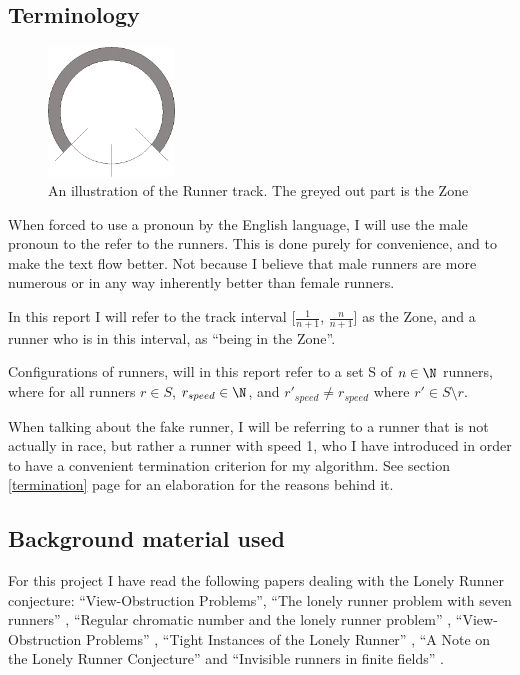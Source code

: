 \subsection{Terminology}
\label{Termonolgy}
\begin{figure}[H]
  \centering
  \includegraphics[width=0.3\textwidth]{./images/circleZonePng.png}
  \caption{\label{circleZoneImg}An illustration of the Runner track. The greyed out part is the Zone}
\end{figure}

When forced to use a pronoun by the English language, I will use the male pronoun to the refer to the runners. This is done purely for convenience, and to make the text flow better. Not because I believe that male runners are more numerous or in any way inherently better than female runners.

\begin{defi}
\label{def:theZone}
In this report I will refer to the track interval [$\frac{1}{n + 1}$, $\frac{n}{n+1}$] as the Zone, and a runner who is in this interval, as ``being in the Zone''.
\end{defi}

\begin{defi}
\label{def:config}
Configurations of runners, will in this report refer to a set S of $n \in \N$ runners, where for all runners $r \in S$, $r_{speed} \in \N$, and $r\prime_{speed} \neq r_{speed}$ where $r\prime \in S \setminus r$.
\end{defi}

\begin{defi}
\label{def:fakeRunner}
When talking about the fake runner, I will be referring to a runner that is not actually in race, but rather a runner with speed 1, who I have introduced in order to have a convenient termination criterion for my algorithm. See section \ref{termination} page \pageref{termination} for an elaboration for the reasons behind it.
\end{defi}  

\subsection{Background material used}
\label{background}
For this project I have read the following papers dealing with the Lonely Runner conjecture: ``View-Obstruction Problems''\cite{Bienia97flows.view-obstructions}, ``The lonely runner problem with seven runners'' \cite{serra_thelonely}, ``Regular chromatic number and the lonely runner problem'' \cite{Barajas2007479}, ``View-Obstruction Problems'' \cite{springerlink:10.1007/BF01832623}, ``Tight Instances of the Lonely Runner'' \cite{Goddyn96tightinstances}, ``A Note on the Lonely Runner Conjecture'' \cite{ANote} and ``Invisible runners in finite fields'' \cite{invis}.


